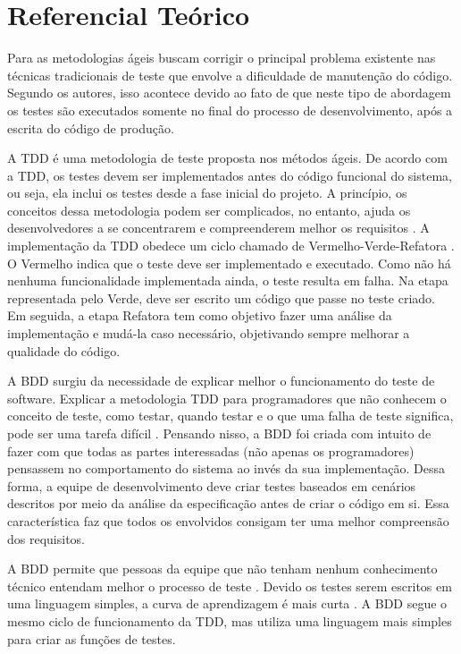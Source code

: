 \chapter{Referencial Teórico}\label{CAP:2}


Para \cite{palod2016agile} as metodologias ágeis buscam corrigir o principal problema existente nas técnicas tradicionais de teste que envolve a dificuldade de manutenção do código. Segundo os autores, isso acontece devido ao fato de que neste tipo de abordagem os testes são executados somente no final do processo de desenvolvimento, após a escrita do código de produção. 

A TDD é uma metodologia de teste proposta nos métodos ágeis. De acordo com a TDD, os testes devem ser implementados antes do código funcional do sistema, ou seja, ela inclui os testes desde a fase inicial do projeto. A princípio, os conceitos dessa metodologia podem ser complicados, no entanto, ajuda os desenvolvedores a se concentrarem e compreenderem melhor os requisitos \cite{moe2019comparative}. A implementação da TDD obedece um ciclo chamado de Vermelho-Verde-Refatora \cite{bulgareli2015requisitos}. O Vermelho indica que o teste deve ser implementado e executado. Como não há nenhuma funcionalidade implementada ainda, o teste resulta em falha. Na etapa representada pelo Verde, deve ser escrito um código que passe no teste criado. Em seguida, a etapa Refatora tem como objetivo fazer uma análise da implementação e mudá-la caso necessário, objetivando sempre melhorar a qualidade do código. 

A BDD surgiu da necessidade de explicar melhor o funcionamento do teste de software. Explicar a metodologia TDD para programadores que não conhecem o conceito de teste, como testar, quando testar e o que uma falha de teste significa, pode ser uma tarefa difícil \cite{bulgareli2015requisitos}. Pensando nisso, a BDD foi criada com intuito de fazer com que todas as partes interessadas (não apenas os programadores) pensassem no comportamento do sistema ao invés da sua implementação. Dessa forma, a equipe de desenvolvimento deve criar testes baseados em cenários descritos por meio da análise da especificação antes de criar o código em si. Essa característica faz que todos os envolvidos consigam ter uma melhor compreensão dos requisitos. 

A BDD permite que pessoas da equipe que não tenham nenhum conhecimento técnico entendam melhor o processo de teste \cite{barus2019implementaion}. Devido os testes serem escritos em uma linguagem simples, a curva de aprendizagem é mais curta \cite{moe2019comparative}. A BDD segue o mesmo ciclo de funcionamento da TDD, mas utiliza uma linguagem mais simples para criar as funções de testes. 


